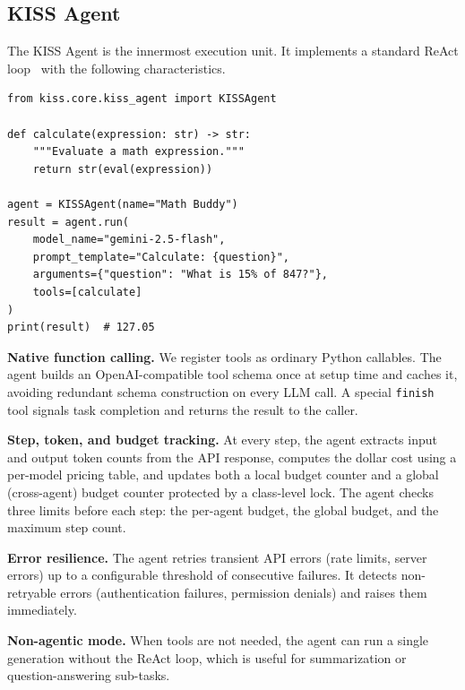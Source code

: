 \documentclass{article}
\begin{document}
\subsection{KISS Agent}
\label{sec:kiss-agent}

The KISS Agent is the innermost execution unit.  It implements a standard ReAct loop~\citep{yao2023react} with the following characteristics.  

\begin{lstlisting}[style=kisspy,numbers=none,caption={A complete KISS agent with a single tool.},label={lst:simple-agent}]
from kiss.core.kiss_agent import KISSAgent

def calculate(expression: str) -> str:
    """Evaluate a math expression."""
    return str(eval(expression))

agent = KISSAgent(name="Math Buddy")
result = agent.run(
    model_name="gemini-2.5-flash",
    prompt_template="Calculate: {question}",
    arguments={"question": "What is 15% of 847?"},
    tools=[calculate]
)
print(result)  # 127.05
\end{lstlisting}

\textbf{Native function calling.}  We register tools as ordinary Python callables.  The agent builds an OpenAI-compatible tool schema once at setup time and caches it, avoiding redundant schema construction on every LLM call.  A special \texttt{finish} tool signals task completion and returns the result to the caller.

\textbf{Step, token, and budget tracking.}  At every step, the agent extracts input and output token counts from the API response, computes the dollar cost using a per-model pricing table, and updates both a local budget counter and a global (cross-agent) budget counter protected by a class-level lock.  The agent checks three limits before each step: the per-agent budget, the global budget, and the maximum step count.

\textbf{Error resilience.}  The agent retries transient API errors (rate limits, server errors) up to a configurable threshold of consecutive failures.  It detects non-retryable errors (authentication failures, permission denials) and raises them immediately.

\textbf{Non-agentic mode.}  When tools are not needed, the agent can run a single generation without the ReAct loop, which is useful for summarization or question-answering sub-tasks.
\end{document}
